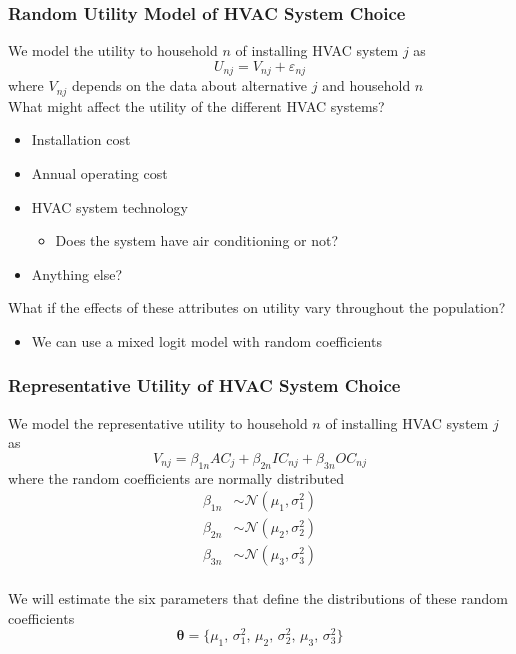\documentclass{beamer}\usepackage[]{graphicx}\usepackage[]{xcolor}
\begin{document}
\begin{frame}\frametitle{Random Utility Model of HVAC System Choice}
    We model the utility to household $n$ of installing HVAC system $j$ as
    $$U_{nj} = V_{nj} + \varepsilon_{nj}$$
    where $V_{nj}$ depends on the data about alternative $j$ and household $n$ \\
    \vspace{2ex}
    What might affect the utility of the different HVAC systems?
	\begin{itemize}
		\item Installation cost
		\item Annual operating cost
		\item HVAC system technology
		\begin{itemize}
			\item Does the system have air conditioning or not?
		\end{itemize}
		\item Anything else?
	\end{itemize}
	\vspace{2ex}
	What if the effects of these attributes on utility vary throughout the population?
	\begin{itemize}
		\item We can use a mixed logit model with random coefficients
	\end{itemize}
\end{frame}

\begin{frame}\frametitle{Representative Utility of HVAC System Choice}
	We model the representative utility to household $n$ of installing HVAC system $j$ as
	$$V_{nj} = \beta_{1n} AC_j + \beta_{2n} IC_{nj} + \beta_{3n} OC_{nj}$$
	where the random coefficients are normally distributed
	\begin{align*}
		\beta_{1n} & \sim \mathcal{N}(\mu_1, \sigma_1^2) \\
		\beta_{2n} & \sim \mathcal{N}(\mu_2, \sigma_2^2) \\
		\beta_{3n} & \sim \mathcal{N}(\mu_3, \sigma_3^2)
	\end{align*} \\
	\vspace{3ex}
	We will estimate the six parameters that define the distributions of these random coefficients
	$$\bm{\theta} = \{ \text{$\mu_1$, $\sigma_1^2$, $\mu_2$, $\sigma_2^2$, $\mu_3$, $\sigma_3^2$} \}$$
\end{frame}
\end{document}
